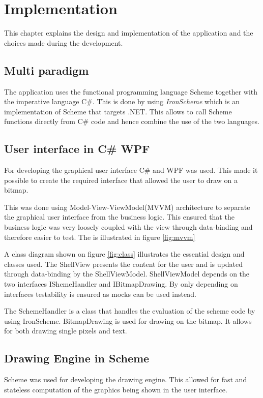 \chapter{Implementation} 
\label{chp:impl}

This chapter explains the design and implementation of the application and the choices made during the development.

\section{Multi paradigm}
The application uses the functional programming language Scheme together with the imperative language C\#. This is done by using \emph{IronScheme} which is an implementation of Scheme that targets .NET. This allows to call Scheme functions directly from C\# code and hence combine the use of the two languages.

\section{User interface in C\# WPF}
For developing the graphical user interface C\# and WPF was used. This made it possible to create the required interface that allowed the user to draw on a bitmap.

This was done using Model-View-ViewModel(MVVM) architecture to separate the graphical user interface from the business logic. This ensured that the business logic was very loosely coupled with the view through data-binding and therefore easier to test. The is illustrated in figure \ref{fig:mvvm}


A class diagram shown on figure \ref{fig:class} illustrates the essential design and classes used. The ShellView presents the content for the user and is updated through data-binding by the ShellViewModel. ShellViewModel depends on the two interfaces IShemeHandler and IBitmapDrawing. By only depending on interfaces testability is ensured as mocks can be used instead. 

The SchemeHandler is a class that handles the evaluation of the scheme code by using IronScheme. BitmapDrawing is used for drawing on the bitmap. It allows for both drawing single pixels and text.


\section{Drawing Engine in Scheme}
Scheme was used for developing the drawing engine. This allowed for fast and stateless computation of the graphics being shown in the user interface.

